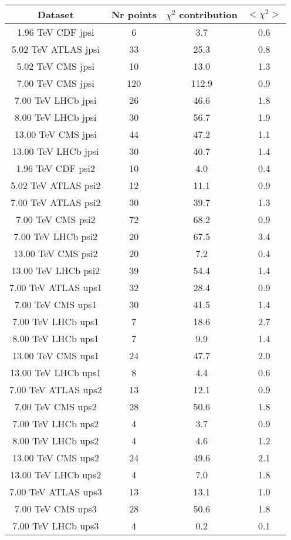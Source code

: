 \begin{table}[h!]
\centering
\begin{tabular}{c|c|c|c}
Dataset & Nr points & $\chi^2$ contribution & $<\chi^2>$ \\
\hline
1.96 TeV CDF jpsi & 6 & 3.7 & 0.6 \\
5.02 TeV ATLAS jpsi & 33 & 25.3 & 0.8 \\
5.02 TeV CMS jpsi & 10 & 13.0 & 1.3 \\
7.00 TeV CMS jpsi & 120 & 112.9 & 0.9 \\
7.00 TeV LHCb jpsi & 26 & 46.6 & 1.8 \\
8.00 TeV LHCb jpsi & 30 & 56.7 & 1.9 \\
13.00 TeV CMS jpsi & 44 & 47.2 & 1.1 \\
13.00 TeV LHCb jpsi & 30 & 40.7 & 1.4 \\
1.96 TeV CDF psi2 & 10 & 4.0 & 0.4 \\
5.02 TeV ATLAS psi2 & 12 & 11.1 & 0.9 \\
7.00 TeV ATLAS psi2 & 30 & 39.7 & 1.3 \\
7.00 TeV CMS psi2 & 72 & 68.2 & 0.9 \\
7.00 TeV LHCb psi2 & 20 & 67.5 & 3.4 \\
13.00 TeV CMS psi2 & 20 & 7.2 & 0.4 \\
13.00 TeV LHCb psi2 & 39 & 54.4 & 1.4 \\
7.00 TeV ATLAS ups1 & 32 & 28.4 & 0.9 \\
7.00 TeV CMS ups1 & 30 & 41.5 & 1.4 \\
7.00 TeV LHCb ups1 & 7 & 18.6 & 2.7 \\
8.00 TeV LHCb ups1 & 7 & 9.9 & 1.4 \\
13.00 TeV CMS ups1 & 24 & 47.7 & 2.0 \\
13.00 TeV LHCb ups1 & 8 & 4.4 & 0.6 \\
7.00 TeV ATLAS ups2 & 13 & 12.1 & 0.9 \\
7.00 TeV CMS ups2 & 28 & 50.6 & 1.8 \\
7.00 TeV LHCb ups2 & 4 & 3.7 & 0.9 \\
8.00 TeV LHCb ups2 & 4 & 4.6 & 1.2 \\
13.00 TeV CMS ups2 & 24 & 49.6 & 2.1 \\
13.00 TeV LHCb ups2 & 4 & 7.0 & 1.8 \\
7.00 TeV ATLAS ups3 & 13 & 13.1 & 1.0 \\
7.00 TeV CMS ups3 & 28 & 50.6 & 1.8 \\
7.00 TeV LHCb ups3 & 4 & 0.2 & 0.1 \\

\end{tabular}
\end{table}
